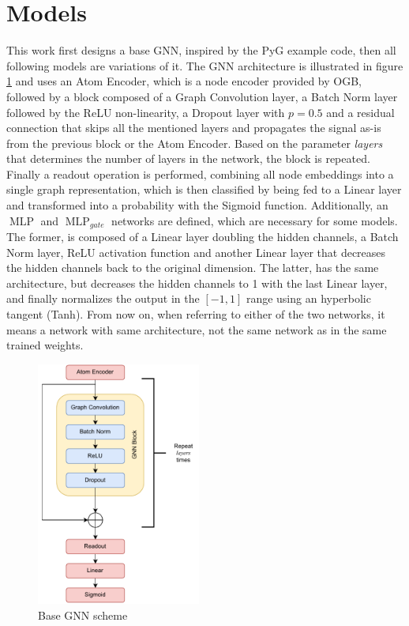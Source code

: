 \documentclass[journal]{IEEEtran}
\begin{document}
\section{Models}
\label{sec:models}
This work first designs a base GNN, inspired by the PyG example code, then all following models are variations of it.
The GNN architecture is illustrated in figure \ref{fig:gnn-scheme} and uses an Atom Encoder, which is a node encoder provided by OGB, followed by a block composed of a Graph Convolution layer, a Batch Norm \cite{ioffe2015batchnorm} layer followed by the ReLU non-linearity, a Dropout layer with $p=0.5$ and a residual connection that skips all the mentioned layers and propagates the signal as-is from the previous block or the Atom Encoder.
Based on the parameter \textit{layers} that determines the number of layers in the network, the block is repeated.
Finally a readout operation is performed, combining all node embeddings into a single graph representation, which is then classified by being fed to a Linear layer and transformed into a probability with the Sigmoid function.
Additionally, an $\operatorname{MLP}$ and $\operatorname{MLP}_{gate}$ networks are defined, which are necessary for some models.
The former, is composed of a Linear layer doubling the hidden channels, a Batch Norm layer, ReLU activation function and another Linear layer that decreases the hidden channels back to the original dimension.
The latter, has the same architecture, but decreases the hidden channels to 1 with the last Linear layer, and finally normalizes the output in the $[-1,1]$ range using an hyperbolic tangent (Tanh).
From now on, when referring to either of the two networks, it means a network with same architecture, not the same network as in the same trained weights.

\begin{figure}
    \centering
    \includegraphics[width=0.48\textwidth]{figures/gnn-scheme.drawio.pdf}
    \caption{Base GNN scheme}
    \label{fig:gnn-scheme}
\end{figure}
\end{document}
